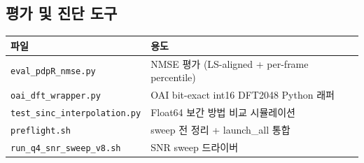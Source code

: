 \documentclass[11pt,a4paper]{article}
\begin{document}
\subsection{평가 및 진단 도구}

\begin{table}[h]\centering
\begin{tabular}{ll}
\toprule
파일 & 용도 \\
\midrule
\texttt{eval\_pdpR\_nmse.py} & NMSE 평가 (LS-aligned + per-frame percentile) \\
\texttt{oai\_dft\_wrapper.py} & OAI bit-exact int16 DFT2048 Python 래퍼 \\
\texttt{test\_sinc\_interpolation.py} & Float64 보간 방법 비교 시뮬레이션 \\
\texttt{preflight.sh} & sweep 전 정리 + launch\_all 통합 \\
\texttt{run\_q4\_snr\_sweep\_v8.sh} & SNR sweep 드라이버 \\
\bottomrule
\end{tabular}
\end{table}
\end{document}
